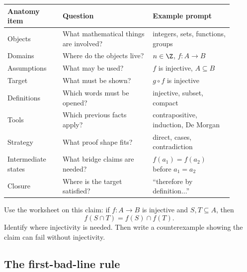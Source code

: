\begin{longtable}{p{0.22\linewidth}p{0.36\linewidth}p{0.32\linewidth}}
\toprule
Anatomy item & Question & Example prompt \\
\midrule
Objects & What mathematical things are involved? & integers, sets, functions, groups \\
Domains & Where do the objects live? & $n\in\Z$, $f:A\to B$ \\
Assumptions & What may be used? & $f$ is injective, $A\subseteq B$ \\
Target & What must be shown? & $g\circ f$ is injective \\
Definitions & Which words must be opened? & injective, subset, compact \\
Tools & Which previous facts apply? & contrapositive, induction, De Morgan \\
Strategy & What proof shape fits? & direct, cases, contradiction \\
Intermediate states & What bridge claims are needed? & $f(a_1)=f(a_2)$ before $a_1=a_2$ \\
Closure & Where is the target satisfied? & ``therefore by definition...'' \\
\bottomrule
\end{longtable}

\begin{center}
\end{center}

\begin{labbox}
Use the worksheet on this claim: if $f:A\to B$ is injective and $S,T\subseteq A$, then
\[
f(S\cap T)=f(S)\cap f(T).
\]
Identify where injectivity is needed. Then write a counterexample showing the claim can fail without injectivity.
\end{labbox}

\subsection{The first-bad-line rule}

